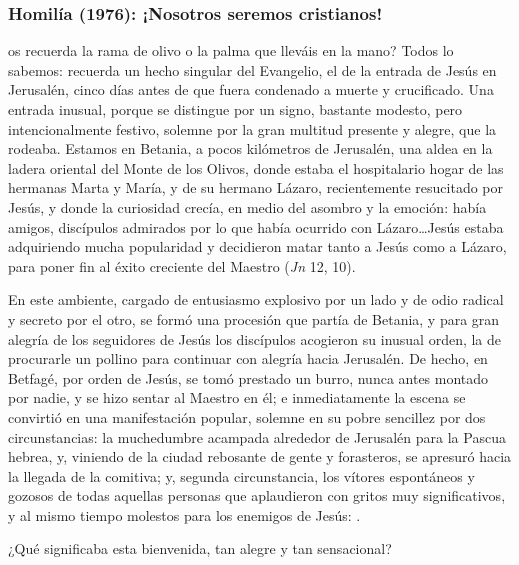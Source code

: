 \newpage 
\subsubsection{Homilía (1976): ¡Nosotros seremos cristianos!}


\begin{body}
 os recuerda la rama de olivo o la palma que lleváis en la mano? Todos lo sabemos: recuerda un hecho singular del Evangelio, el de la entrada de Jesús en Jerusalén, cinco días antes de que fuera condenado a muerte y crucificado. Una entrada inusual, porque se distingue por un signo, bastante modesto, pero intencionalmente festivo, solemne por la gran multitud presente y alegre, que la rodeaba. Estamos en Betania, a pocos kilómetros de Jerusalén, una aldea en la ladera oriental del Monte de los Olivos, donde estaba el hospitalario hogar de las hermanas Marta y María, y de su hermano Lázaro, recientemente resucitado por Jesús, y donde la curiosidad crecía, en medio del asombro y la emoción: había amigos, discípulos admirados por lo que había ocurrido con Lázaro\ldots Jesús estaba adquiriendo mucha popularidad y decidieron matar tanto a Jesús como a Lázaro, para poner fin al éxito creciente del Maestro (\textit{Jn} 12, 10). 

En este ambiente, cargado de entusiasmo explosivo por un lado y de odio radical y secreto por el otro, se formó una procesión que partía de Betania, y para gran alegría de los seguidores de Jesús los discípulos acogieron su inusual orden, la de procurarle un pollino para continuar con alegría hacia Jerusalén. De hecho, en Betfagé, por orden de Jesús, se tomó prestado un burro, nunca antes montado por nadie, y se hizo sentar al Maestro en él; e inmediatamente la escena se convirtió en una manifestación popular, solemne en su pobre sencillez por dos circunstancias: la muchedumbre acampada alrededor de Jerusalén para la Pascua hebrea, y, viniendo de la ciudad rebosante de gente y forasteros, se apresuró hacia la llegada de la comitiva; y, segunda circunstancia, los vítores espontáneos y gozosos de todas aquellas personas que aplaudieron con gritos muy significativos, y al mismo tiempo molestos para los enemigos de Jesús: .

¿Qué significaba esta bienvenida, tan alegre y tan sensacional?


\end{body}
